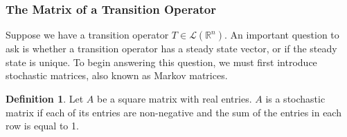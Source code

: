 \documentclass{article}
\renewcommand{\L}{\mathcal{L}}
\newcommand{\R}{\mathbb{R}}
\theoremstyle{definition}
\newtheorem{definition}{Definition}
\begin{document}
\subsubsection{The Matrix of a Transition Operator}
\label{sec: stochastic-matrix}

Suppose we have a transition operator $T \in \L(\R^n)$. An important question to ask is whether a transition operator has a steady state vector, or if the steady state is unique. To begin answering this question, we must first introduce stochastic matrices, also known as Markov matrices.

\begin{definition}
    Let $A$ be a square matrix with real entries. $A$ is a stochastic matrix if each of its entries are non-negative and the sum of the entries in each row is equal to 1.
\end{definition}
\end{document}
